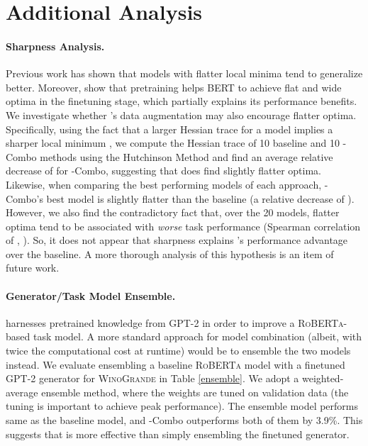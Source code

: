 \documentclass[11pt,a4paper]{article}
\newcommand{\gdaug}{}
\newcommand{\winogrande}{\textsc{WinoGrande}\xspace}
\newcommand{\gpt}{\textsc{GPT-2}\xspace}
\newcommand{\roberta}{\textsc{RoBERTa}\xspace}
\begin{document}
\section{Additional Analysis}
\label{app:additional}


\paragraph{Sharpness Analysis.} 
Previous work \cite{Hochreiter1997FlatM,Keskar2016OnLT,Yao2019PyHessianNN} has shown that models with flatter local minima tend to generalize better. Moreover, \citet{Hao2019VisualizingAU} show that pretraining helps BERT to achieve flat and wide optima in the finetuning stage, which partially explains its performance benefits. We investigate whether \gdaug 's data augmentation may also encourage flatter optima.  Specifically, using the fact that a larger Hessian trace for a model implies a sharper local minimum \cite{Yao2019PyHessianNN}, we compute the Hessian trace of 10 baseline and 10 \gdaug-Combo methods using the Hutchinson Method \cite{Avron2011RandomizedAF} and find an average relative decrease of  for \gdaug-Combo, suggesting that \gdaug does find slightly flatter optima. Likewise, when comparing the best performing models of each approach, \gdaug-Combo's best model is slightly flatter than the baseline (a relative decrease of ). However, we also find the contradictory fact that, over the 20 models, flatter optima tend to be associated with {\em worse} task performance (Spearman correlation of , ).  So, it does not appear that sharpness explains \gdaug's performance advantage over the baseline. 
A more thorough analysis of this hypothesis is an item of future work.

\paragraph{Generator/Task Model Ensemble.} 
\gdaug harnesses pretrained knowledge from \gpt in order to improve a \roberta -based task model.  A more standard approach for model combination (albeit, with twice the computational cost at runtime) would be to ensemble the two models instead.  We evaluate ensembling a baseline \roberta model with a finetuned \gpt generator for \winogrande in Table \ref{ensemble}. We adopt a weighted-average ensemble method, where the weights are tuned on validation data (the tuning is important to achieve peak performance). The ensemble model performs same as the baseline model, and \gdaug-Combo outperforms both of them by 3.9\%. This suggests that \gdaug is more effective than simply ensembling the finetuned generator. 
 
\end{document}

